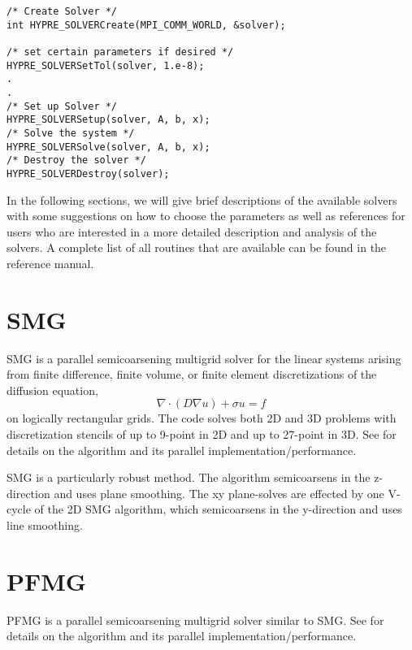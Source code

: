 \begin{display}
\begin{verbatim}
/* Create Solver */
int HYPRE_SOLVERCreate(MPI_COMM_WORLD, &solver); 

/* set certain parameters if desired */
HYPRE_SOLVERSetTol(solver, 1.e-8);
.
.
/* Set up Solver */
HYPRE_SOLVERSetup(solver, A, b, x);
/* Solve the system */
HYPRE_SOLVERSolve(solver, A, b, x);
/* Destroy the solver */
HYPRE_SOLVERDestroy(solver);
\end{verbatim}
\end{display}

In the following sections, we will give brief descriptions of the available \hypre{} solvers
with some suggestions on how to choose the parameters as well as references for users 
who are interested in a more detailed description and analysis of the solvers.
A complete list of all routines that are available can be found in the reference manual.

\section{SMG}

SMG is a parallel semicoarsening multigrid solver for the linear
systems arising from finite difference, finite volume, or finite
element discretizations of the diffusion equation,
\begin{equation}
\nabla \cdot ( D \nabla u ) + \sigma u = f
\end{equation}
on logically rectangular grids.  The code solves both 2D and 3D
problems with discretization stencils of up to 9-point in 2D and up to
27-point in 3D.  See
\cite{SSchaffer_1998a,PNBrown_RDFalgout_JEJones_2000,RDFalgout_JEJones_2000}
for details on the algorithm and its parallel implementation/performance.

SMG is a particularly robust method.  The algorithm semicoarsens in
the z-direction and uses plane smoothing.  The xy plane-solves are
effected by one V-cycle of the 2D SMG algorithm, which semicoarsens in
the y-direction and uses line smoothing.


\section{PFMG}

PFMG is a parallel semicoarsening multigrid solver similar to SMG.
See \cite{SFAshby_RDFalgout_1996,RDFalgout_JEJones_2000} for details
on the algorithm and its parallel implementation/performance.

